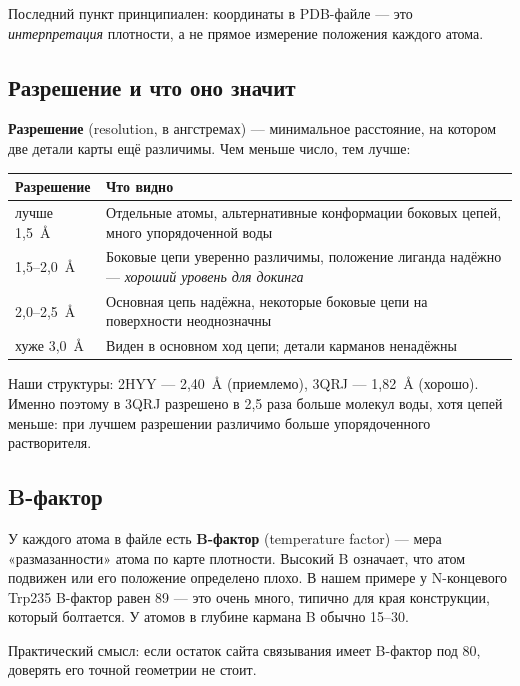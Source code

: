 \documentclass[12pt,a4paper]{article}
\begin{document}
Последний пункт принципиален: координаты в PDB-файле --- это \emph{интерпретация}
плотности, а не прямое измерение положения каждого атома.

\subsection{Разрешение и что оно значит}

\textbf{Разрешение} (resolution, в ангстремах) --- минимальное расстояние, на
котором две детали карты ещё различимы. Чем меньше число, тем лучше:

\begin{center}
\begin{tabular}{L{3.0cm}L{11.5cm}}
\toprule
\textbf{Разрешение} & \textbf{Что видно} \\
\midrule
лучше 1{,}5~\AA & Отдельные атомы, альтернативные конформации боковых цепей, много
упорядоченной воды \\
1{,}5--2{,}0~\AA & Боковые цепи уверенно различимы, положение лиганда надёжно ---
\emph{хороший уровень для докинга} \\
2{,}0--2{,}5~\AA & Основная цепь надёжна, некоторые боковые цепи на поверхности
неоднозначны \\
хуже 3{,}0~\AA & Виден в основном ход цепи; детали карманов ненадёжны \\
\bottomrule
\end{tabular}
\end{center}

Наши структуры: 2HYY --- 2{,}40~\AA{} (приемлемо), 3QRJ --- 1{,}82~\AA{} (хорошо).
Именно поэтому в 3QRJ разрешено в 2{,}5 раза больше молекул воды, хотя цепей
меньше: при лучшем разрешении различимо больше упорядоченного растворителя.

\subsection{B-фактор}

У каждого атома в файле есть \textbf{B-фактор} (temperature factor) --- мера
«размазанности» атома по карте плотности. Высокий B означает, что атом подвижен или
его положение определено плохо. В нашем примере у N-концевого Trp235 B-фактор
равен 89 --- это очень много, типично для края конструкции, который болтается.
У атомов в глубине кармана B обычно 15--30.

Практический смысл: если остаток сайта связывания имеет B-фактор под 80, доверять
его точной геометрии не стоит.
\end{document}

